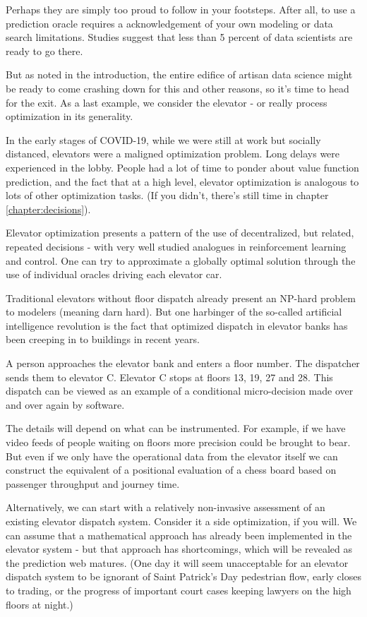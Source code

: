 Perhaps they are simply too proud to follow in your footsteps. After all, to use a prediction oracle requires a acknowledgement of your own modeling or data search limitations. Studies suggest that less than 5 percent of data scientists are ready to go there. 

But as noted in the introduction, the entire edifice of artisan data science might be ready to come crashing down for this and other reasons, so it's time to head for the exit. As a last example, we consider the elevator - or really process optimization in its generality.  

In the early stages of COVID-19, while we were still at work but socially distanced, elevators were a maligned optimization problem. Long delays were experienced in the lobby. People had a lot of time to ponder about value function prediction, and the fact that at a high level, elevator optimization is analogous to lots of other optimization tasks. (If you didn't, there's still time in chapter \ref{chapter:decisions}).

Elevator optimization presents a pattern of the use of decentralized, but related, repeated decisions - with very well studied analogues in reinforcement learning and control. One can try to approximate a globally optimal solution through the use of individual oracles driving each elevator car. 

Traditional elevators without floor dispatch already present an NP-hard problem to modelers (meaning darn hard). But one harbinger of the so-called artificial intelligence revolution is the fact that optimized dispatch in elevator banks has been creeping in to buildings in recent years. 

A person approaches the elevator bank and enters a floor number. The dispatcher sends them to elevator C. Elevator C stops at floors 13, 19, 27 and 28. This dispatch can be viewed as an example of a conditional micro-decision made over and over again by software. 

The details will depend on what can be instrumented. For example, if we have video feeds of people waiting on floors more precision could be brought to bear. But even if we only have the operational data from the elevator itself we can construct the equivalent of a positional evaluation of a chess board based on passenger throughput and journey time. 

Alternatively, we can start with a relatively non-invasive assessment of an existing elevator dispatch system. Consider it a side optimization, if you will. We can assume that a mathematical approach has already been implemented in the elevator system - but that approach has shortcomings, which will be revealed as the prediction web matures. (One day it will seem unacceptable for an elevator dispatch system to be ignorant of Saint Patrick's Day pedestrian flow, early closes to trading, or the progress of important court cases keeping lawyers on the high floors at night.)  

